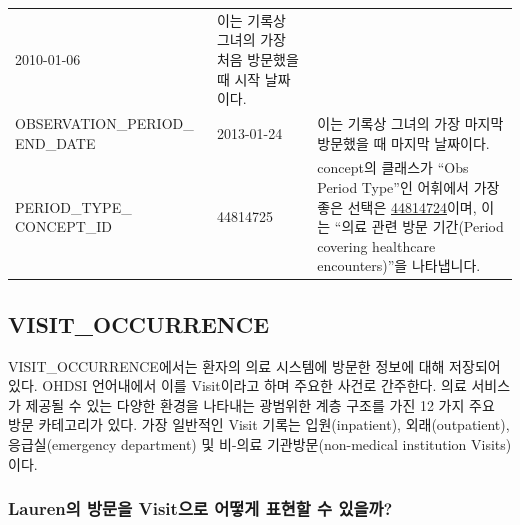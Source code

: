 \documentclass[11pt]{book}
\theoremstyle{definition}
\theoremstyle{definition}
\theoremstyle{definition}
\theoremstyle{remark}
\begin{document}
\begin{longtable}[]{@{}lll@{}}
\begin{minipage}[t]{0.14\columnwidth}
2010-01-06\strut
\end{minipage} & \begin{minipage}[t]{0.48\columnwidth}\raggedright\strut
이는 기록상 그녀의 가장 처음 방문했을 때 시작 날짜이다.\strut
\end{minipage}\tabularnewline
\begin{minipage}[t]{0.29\columnwidth}\raggedright\strut
OBSERVATION\_PERIOD\_ END\_DATE\strut
\end{minipage} & \begin{minipage}[t]{0.14\columnwidth}\raggedright\strut
2013-01-24\strut
\end{minipage} & \begin{minipage}[t]{0.48\columnwidth}\raggedright\strut
이는 기록상 그녀의 가장 마지막 방문했을 때 마지막 날짜이다.\strut
\end{minipage}\tabularnewline
\begin{minipage}[t]{0.29\columnwidth}\raggedright\strut
PERIOD\_TYPE\_ CONCEPT\_ID\strut
\end{minipage} & \begin{minipage}[t]{0.14\columnwidth}\raggedright\strut
44814725\strut
\end{minipage} & \begin{minipage}[t]{0.48\columnwidth}\raggedright\strut
concept의 클래스가 ``Obs Period Type''인 어휘에서 가장 좋은 선택은
\href{http://athena.ohdsi.org/search-terms/terms/44814724}{44814724}이며,
이는 ``의료 관련 방문 기간(Period covering healthcare encounters)''을
나타냅니다.\strut
\end{minipage}\tabularnewline
\bottomrule
\end{longtable}

\subsection{VISIT\_OCCURRENCE}\label{visitOccurrence}

VISIT\_OCCURRENCE에서는 환자의 의료 시스템에 방문한 정보에 대해 저장되어
있다. OHDSI 언어내에서 이를 Visit이라고 하며 주요한 사건로 간주한다.
의료 서비스가 제공될 수 있는 다양한 환경을 나타내는 광범위한 계층 구조를
가진 12 가지 주요 방문 카테고리가 있다. 가장 일반적인 Visit 기록는
입원(inpatient), 외래(outpatient), 응급실(emergency department) 및
비-의료 기관방문(non-medical institution Visits)이다.

\subsubsection*{Lauren의 방문을 Visit으로 어떻게 표현할 수
있을까?}\label{lauren--visit----}
\end{document}
